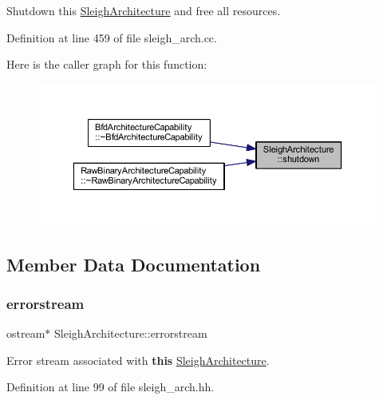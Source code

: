 Shutdown this \mbox{\hyperlink{class_sleigh_architecture}{Sleigh\+Architecture}} and free all resources. 



Definition at line 459 of file sleigh\+\_\+arch.\+cc.

Here is the caller graph for this function\+:
\nopagebreak
\begin{figure}[H]
\begin{center}
\leavevmode
\includegraphics[width=350pt]{class_sleigh_architecture_a1765d06764b5b9d284340a2c457011f8_icgraph}
\end{center}
\end{figure}


\subsection{Member Data Documentation}
\mbox{\label{class_sleigh_architecture_a338fd8b6671bc55ba6d6d4e8307957e9}} 
\subsubsection{\texorpdfstring{errorstream}{errorstream}}
{\footnotesize\ttfamily ostream$\ast$ Sleigh\+Architecture\+::errorstream\hspace{0.3cm}{\ttfamily [protected]}}



Error stream associated with {\bfseries{this}} \mbox{\hyperlink{class_sleigh_architecture}{Sleigh\+Architecture}}. 



Definition at line 99 of file sleigh\+\_\+arch.\+hh.

\mbox{\label{class_sleigh_architecture_a198973e576c4ea3039c7deac29402aed}} 
